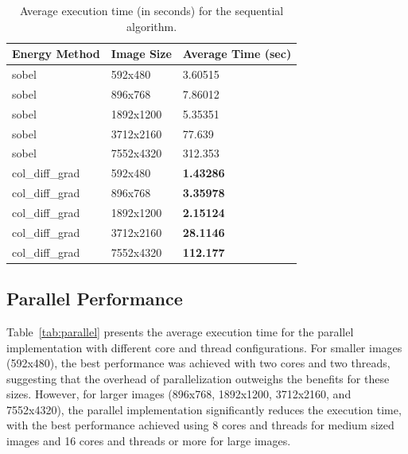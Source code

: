 \documentclass[9pt]{IEEEtran}
\begin{document}
\begin{table}[h]
    \centering
    \caption{Average execution time (in seconds) for the sequential algorithm.}
    \label{tab:sequential}
    \begin{tabular}{|l|l|l|}
        \hline
        Energy Method & Image Size & Average Time (sec) \\ \hline
        sobel & 592x480 & 3.60515 \\ \hline
        sobel & 896x768 & 7.86012 \\ \hline
        sobel & 1892x1200 & 5.35351 \\ \hline
        sobel & 3712x2160 & 77.639 \\ \hline
        sobel & 7552x4320 & 312.353 \\ \hline
        \hline
        col\_diff\_grad & 592x480 & \textbf{1.43286} \\ \hline
        col\_diff\_grad & 896x768 & \textbf{3.35978} \\ \hline
        col\_diff\_grad & 1892x1200 & \textbf{2.15124} \\ \hline
        col\_diff\_grad & 3712x2160 & \textbf{28.1146} \\ \hline
        col\_diff\_grad & 7552x4320 & \textbf{112.177} \\ \hline
    \end{tabular}
\end{table}

\subsection{Parallel Performance}
Table~\ref{tab:parallel} presents the average execution time for the parallel implementation with different core and thread configurations. For smaller images (592x480), the best performance was achieved with two cores and two threads, suggesting that the overhead of parallelization outweighs the benefits for these sizes. However, for larger images (896x768, 1892x1200, 3712x2160, and 7552x4320), the parallel implementation significantly reduces the execution time, with the best performance achieved using 8 cores and threads for medium sized images and 16 cores and threads or more for large images.
\end{document}
